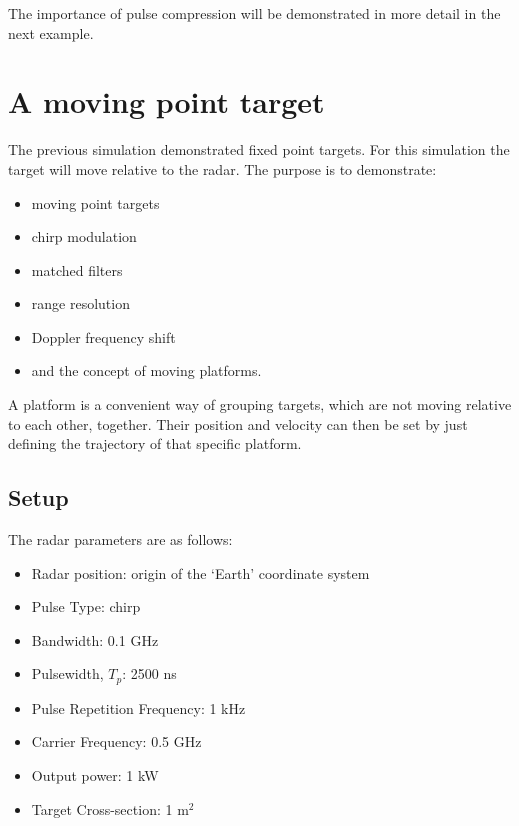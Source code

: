 The importance of pulse compression will be demonstrated in more detail in
the next example.%
\pagebreak%

\section{\protect\smallskip \protect\smallskip A moving point target}

The previous simulation demonstrated fixed point targets. For this
simulation the target will move relative to the radar. The purpose is to
demonstrate:

\begin{itemize}
\item  moving point targets

\item  chirp modulation

\item  matched filters

\item  range resolution

\item  Doppler frequency shift

\item  and the concept of moving platforms.
\end{itemize}

A platform is a convenient way of grouping targets, which are not moving
relative to each other, together. Their position and velocity can then be
set by just defining the trajectory of that specific platform.

\subsection{Setup}

\smallskip \smallskip The radar parameters are as follows:

\begin{itemize}
\begin{itemize}
\item  Radar position: origin of the `Earth' coordinate system

\item  \smallskip Pulse Type: chirp

\item  Bandwidth: 0.1 GHz

\item  \smallskip Pulsewidth, $T_{p}$: 2500 ns

\item  Pulse Repetition Frequency: 1 kHz

\item  Carrier Frequency: 0.5 GHz

\item  Output power: 1 kW

\item  Target Cross-section: 1 m$^{2}$
\end{itemize}
\end{itemize}


